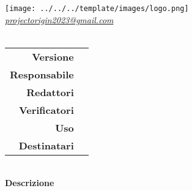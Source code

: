 \thispagestyle{empty}
\renewcommand{\arraystretch}{1.3}

\begin{titlepage}
	\begin{center}
		
	\texttt{[image: ../../../template/images/logo.png]}
	\\[1cm]
	\href{mailto:projectorigin2023@gmail.com}		      	
	{\large{\textit{projectorigin2023@gmail.com} } }\\[2.5cm]
	\Huge \textbf{\doctitle} \\[1cm]
	 \large
			 \begin{tabular}{r|l}
                        \textbf{Versione} & \rev{} \\
                        \textbf{Responsabile} & \resp{} \\
                        \textbf{Redattori} & \red{} \\ 
                        \textbf{Verificatori} &  \ver{} \\
                        \textbf{Uso} & \uso{} \\                        
                        \textbf{Destinatari} & \parbox[t]{5cm}{ \dest{} }
                \end{tabular} 
                \\[3.3cm]
                \large \textbf{Descrizione} \\ \describedoc{} 
     \end{center}
\end{titlepage}